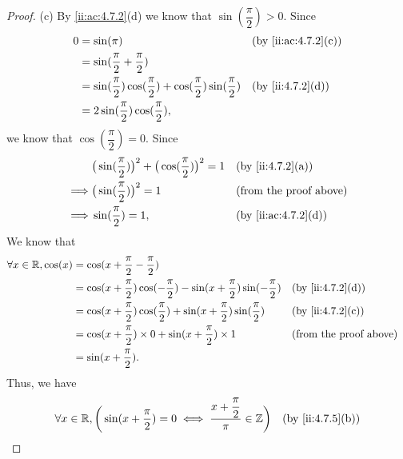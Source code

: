 \begin{proof}{(c)}
  By \cref{ii:ac:4.7.2}(d) we know that \(\sin(\dfrac{\pi}{2}) > 0\).
  Since
  \begin{align*}
    0 & = \sin(\pi)                                                                             &  & \by{ii:ac:4.7.2}[c] \\
      & = \sin(\dfrac{\pi}{2} + \dfrac{\pi}{2})                                                                          \\
      & = \sin(\dfrac{\pi}{2}) \cos(\dfrac{\pi}{2}) + \cos(\dfrac{\pi}{2}) \sin(\dfrac{\pi}{2}) &  & \by{ii:4.7.2}[d]    \\
      & = 2 \sin(\dfrac{\pi}{2}) \cos(\dfrac{\pi}{2}),
  \end{align*}
  we know that \(\cos(\dfrac{\pi}{2}) = 0\).
  Since
  \begin{align*}
             & \big(\sin(\dfrac{\pi}{2})\big)^2 + \big(\cos(\dfrac{\pi}{2})\big)^2 = 1 &  & \by{ii:4.7.2}[a]              \\
    \implies & \big(\sin(\dfrac{\pi}{2})\big)^2 = 1                                    &  & \text{(from the proof above)} \\
    \implies & \sin(\dfrac{\pi}{2}) = 1,                                               &  & \by{ii:ac:4.7.2}[d]
  \end{align*}
  We know that
  \begin{align*}
    \forall x \in \R, \cos(x) & = \cos(x + \dfrac{\pi}{2} - \dfrac{\pi}{2})                                                                                          \\
                              & = \cos(x + \dfrac{\pi}{2}) \cos(-\dfrac{\pi}{2}) - \sin(x + \dfrac{\pi}{2}) \sin(-\dfrac{\pi}{2}) &  & \by{ii:4.7.2}[d]              \\
                              & = \cos(x + \dfrac{\pi}{2}) \cos(\dfrac{\pi}{2}) + \sin(x + \dfrac{\pi}{2}) \sin(\dfrac{\pi}{2})   &  & \by{ii:4.7.2}[c]              \\
                              & = \cos(x + \dfrac{\pi}{2}) \times 0 + \sin(x + \dfrac{\pi}{2}) \times 1                           &  & \text{(from the proof above)} \\
                              & = \sin(x + \dfrac{\pi}{2}).
  \end{align*}
  Thus, we have
  \begin{align*}
         & \forall x \in \R, \bigg(\sin(x + \dfrac{\pi}{2}) = 0 \iff \dfrac{x + \dfrac{\pi}{2}}{\pi} \in \Z\bigg)  &  & \by{ii:4.7.5}[b]              \\

\end{align*}
\end{proof}
